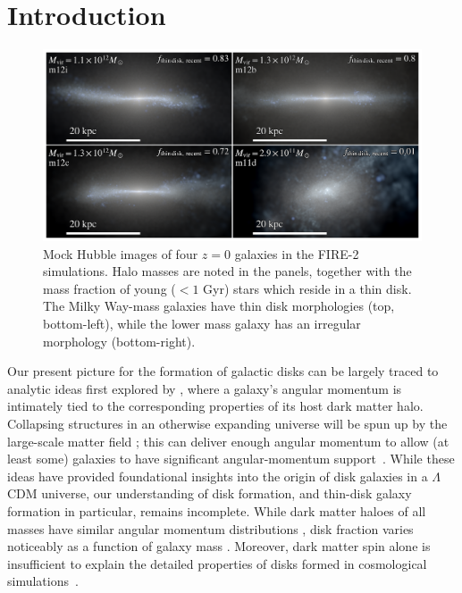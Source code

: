 \documentclass[fleqn,usenatbib]{mnras}
\begin{document}


\section{Introduction}
\label{s: introduction}

\begin{figure}
    \centering
    \includegraphics[width=\textwidth]{figures/stars.pdf}
    \caption{
    Mock Hubble images of four $z=0$ galaxies in the FIRE-2 simulations. Halo masses are noted in the panels, together with the mass fraction of young ($<1$ Gyr) stars which reside in a thin disk.  The Milky Way-mass galaxies have thin disk morphologies (top, bottom-left), while the lower mass galaxy has an irregular morphology (bottom-right).
    }
    \label{f: stars}
\end{figure}

Our present picture for the formation of galactic disks can be largely traced to analytic ideas first explored by \citet{fall1980}, where a galaxy's angular momentum is intimately tied to the corresponding properties of its host dark matter halo.
Collapsing structures in an otherwise expanding universe will be spun up by the large-scale matter field \citep{Peebles69};
this can deliver enough angular momentum to allow (at least some) galaxies to have significant angular-momentum support~\citep[e.g.][]{MMW98}. 
While these ideas have provided foundational insights into the origin of disk galaxies in a $\Lambda$CDM universe, our understanding of disk  formation, and thin-disk galaxy formation in particular, remains incomplete. 
While dark matter haloes of all masses have similar angular momentum distributions \citep[e.g.][]{Barnes87}, disk fraction varies noticeably as a function of galaxy mass \citep[e.g.][]{Bernardi2010, Bluck2014, Moffett16}.
Moreover, dark matter spin alone is insufficient to explain the detailed properties of disks formed in cosmological simulations~\citep[e.g.][]{Sales2012, GK18}.  
\end{document}
